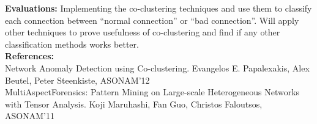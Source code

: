 \documentclass[a4paper,11pt]{article}
\theoremstyle{quest}
\begin{document}
\textbf{Evaluations:} Implementing the co-clustering techniques and use them to classify each connection between ``normal connection'' or ``bad connection''. Will apply other techniques to prove usefulness of co-clustering and find if any other classification methods works better.\\

\textbf{References: } \\
Network Anomaly Detection using Co-clustering. Evangelos E. Papalexakis, Alex Beutel, Peter Steenkiste, ASONAM'12\\
MultiAspectForensics: Pattern Mining on Large-scale Heterogeneous Networks with Tensor Analysis. Koji Maruhashi, Fan Guo, Christos Faloutsos, ASONAM'11
 
\end{document}

